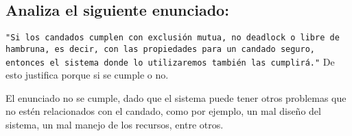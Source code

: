 \documentclass{article}
\begin{document}
\subsection{Analiza el siguiente enunciado:}
\texttt{"Si los candados cumplen con exclusión mutua, no deadlock o libre de hambruna, es decir, con las propiedades para un candado seguro, entonces el sistema donde lo utilizaremos también las cumplirá."} De esto justifica porque si se cumple o no.

El enunciado no se cumple, dado que el sistema puede tener otros problemas que no estén relacionados con el candado, como por ejemplo, un mal diseño del sistema, un mal manejo de los recursos, entre otros.
\end{document}
